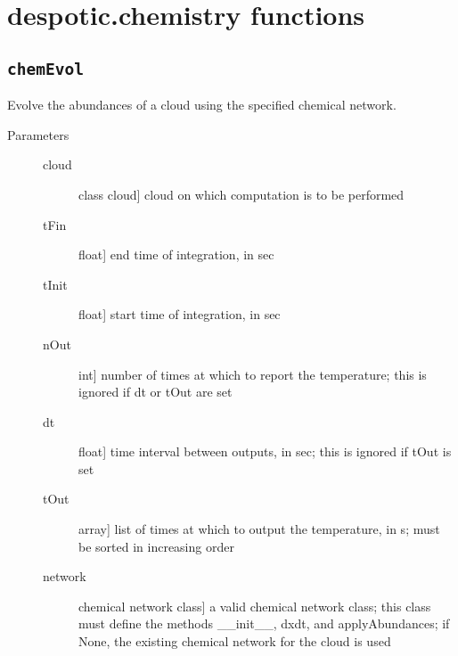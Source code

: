 \documentclass[letterpaper,10pt,english]{sphinxmanual}
\begin{document}
\section{despotic.chemistry functions}
\label{fulldoc:despotic-chemistry-functions}

\subsection{\texttt{chemEvol}}
\label{fulldoc:chemevol}

\begin{fulllineitems}
\label{fulldoc:despotic.chemistry.chemEvol}
Evolve the abundances of a cloud using the specified chemical
network.
\begin{description}
\item[{Parameters}] \leavevmode\begin{description}
\item[{cloud}] \leavevmode{[}class cloud{]}
cloud on which computation is to be performed

\item[{tFin}] \leavevmode{[}float{]}
end time of integration, in sec

\item[{tInit}] \leavevmode{[}float{]}
start time of integration, in sec

\item[{nOut}] \leavevmode{[}int{]}
number of times at which to report the temperature; this
is ignored if dt or tOut are set

\item[{dt}] \leavevmode{[}float{]}
time interval between outputs, in sec; this is ignored if
tOut is set

\item[{tOut}] \leavevmode{[}array{]}
list of times at which to output the temperature, in s;
must be sorted in increasing order

\item[{network}] \leavevmode{[}chemical network class{]}
a valid chemical network class; this class must define the
methods \_\_init\_\_, dxdt, and applyAbundances; if None, the
existing chemical network for the cloud is used


\end{description}
\end{description}
\end{fulllineitems}
\end{document}
